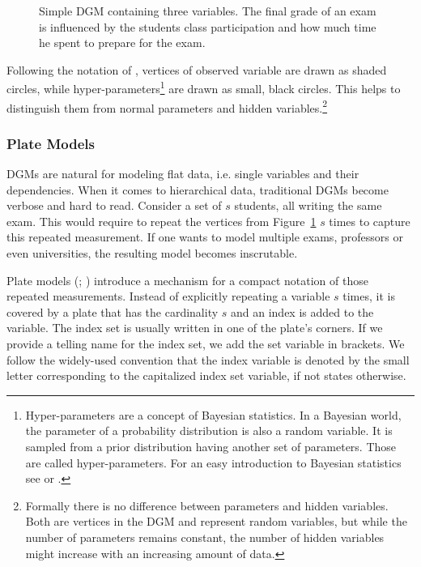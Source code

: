 \begin{figure}[t]
	\begin{center}
    	\scalebox{\tikzScale}{\adjustTikzSize }
	\end{center}
\caption[Simple directed graphical model containing three variables.]{Simple DGM containing three variables. The final grade of an exam is influenced by the students class participation and how much time he spent to prepare for the exam.}
		\label{fig:simple_dgm}
\end{figure}

Following the notation of \textcite{bishop2006pattern}, vertices of observed variable are drawn as shaded circles, while hyper-parameters\footnote{Hyper-parameters are a concept of Bayesian statistics. In a Bayesian world, the parameter of a probability distribution is also a random variable. It is sampled from a prior distribution having another set of parameters. Those are called hyper-parameters. For an easy introduction to Bayesian statistics see \textcite{gelman2013bayesian} or \textcite{kruschke2010doing}.} are drawn as small, black circles. This helps to distinguish them from normal parameters and hidden variables.\footnote{Formally there is no difference between parameters and hidden variables. Both are vertices in the DGM and represent random variables, but while the number of parameters remains constant, the number of hidden variables might increase with an increasing amount of data.}

\subsubsection{Plate Models}

DGMs are natural for modeling flat data, i.e. single variables and their dependencies. When it comes to hierarchical data, traditional DGMs become verbose and hard to read. Consider a set of $s$ students, all writing the same exam. This would require to repeat the vertices from Figure~\ref{fig:simple_dgm} $s$ times to capture this repeated measurement. If one wants to model multiple exams, professors or even universities, the resulting model becomes inscrutable.

Plate models (\cite{buntine1994operations}; \cite{gilks1994language}) introduce a mechanism for a compact notation of those repeated measurements. Instead of explicitly repeating a variable $s$ times, it is covered by a plate that has the cardinality $s$ and an index is added to the variable. The index set is usually written in one of the plate's corners. If we provide a telling name for the index set, we add the set variable in brackets. We follow the widely-used convention that the index variable is denoted by the small letter corresponding to the capitalized index set variable, if not states otherwise.

